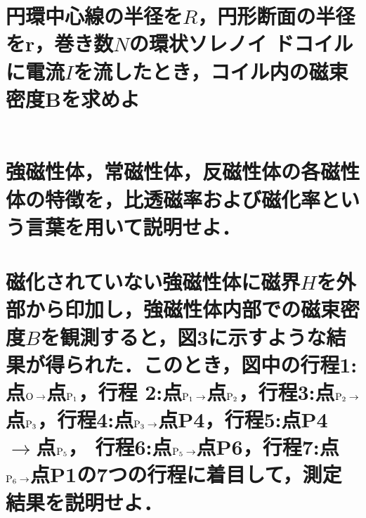 \documentclass[dvipdfmx]{ujarticle}
\begin{document}
\section{円環中心線の半径を$R$，円形断面の半径をr，巻き数$N$の環状ソレノイ
ドコイルに電流$I$を流したとき，コイル内の磁束密度$\boldsymbol{B}$を求めよ}
\begin{align*}
\end{align*}

\section{強磁性体，常磁性体，反磁性体の各磁性体の特徴を，比透磁率および磁化率という言葉を用いて説明せよ．}

\section{磁化されていない強磁性体に磁界$H$を外部から印加し，強磁性体内部での磁束密度$B$を観測すると，図3に示すような結果が得られた．このとき，図中の行程1:点$\rm{O}\to$点$\rm{P_{1}}$，行程 2:点$\rm{P_{1}}\to$点$\rm{P_{2}}$，行程3:点$\rm{P_{2}}\to$点$\rm{P_{3}}$，行程4:点$\rm{P_{3}}\to$点P4，行程5:点P4 $\to$点$\rm{P_{5}}$， 行程6:点$\rm{P_{5}}\to$点P6，行程7:点$\rm{P_{6}}\to$点P1の7つの行程に着目して，測定結果を説明せよ．}
\end{document}
